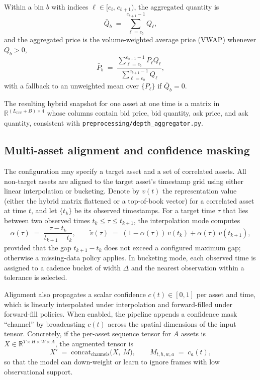 \documentclass[11pt]{article}
\begin{document}
Within a bin $b$ with indices $\ell \in [e_b, e_{b+1})$, the aggregated quantity is
\begin{equation}
  \bar{Q}_{b} \;=\; \sum_{\ell=e_b}^{e_{b+1}-1} Q_{\ell},
\end{equation}
and the aggregated price is the volume-weighted average price (VWAP) whenever $\bar{Q}_b>0$,
\begin{equation}
  \bar{P}_{b} \;=\; \frac{\sum_{\ell=e_b}^{e_{b+1}-1} P_{\ell} Q_{\ell}}{\sum_{\ell=e_b}^{e_{b+1}-1} Q_{\ell}},
\end{equation}
with a fallback to an unweighted mean over $\{P_{\ell}\}$ if $\bar{Q}_b=0$.

The resulting hybrid snapshot for one asset at one time is a matrix in $\mathbb{R}^{(L_{\mathrm{raw}}+B)\times 4}$ whose columns contain bid price, bid quantity, ask price, and ask quantity, consistent with \texttt{preprocessing/depth\_aggregator.py}.

\subsection{Multi-asset alignment and confidence masking}

The configuration may specify a target asset and a set of correlated assets. All non-target assets are aligned to the target asset's timestamp grid using either linear interpolation or bucketing. Denote by $v(t)$ the representation value (either the hybrid matrix flattened or a top-of-book vector) for a correlated asset at time $t$, and let $\{t_k\}$ be its observed timestamps. For a target time $\tau$ that lies between two observed times $t_{k}\le \tau \le t_{k+1}$, the interpolation mode computes
\begin{equation}
  \alpha(\tau) \;=\; \frac{\tau - t_k}{t_{k+1}-t_k}, \qquad \tilde{v}(\tau) \;=\; (1-\alpha(\tau))\,v(t_k) + \alpha(\tau)\,v(t_{k+1}),
\end{equation}
provided that the gap $t_{k+1}-t_k$ does not exceed a configured maximum gap; otherwise a missing-data policy applies. In bucketing mode, each observed time is assigned to a cadence bucket of width $\Delta$ and the nearest observation within a tolerance is selected.

Alignment also propagates a scalar confidence $c(t)\in[0,1]$ per asset and time, which is linearly interpolated under interpolation and forward-filled under forward-fill policies. When enabled, the pipeline appends a confidence mask ``channel'' by broadcasting $c(t)$ across the spatial dimensions of the input tensor. Concretely, if the per-asset sequence tensor for $A$ assets is $X\in\mathbb{R}^{T\times H\times W\times A}$, the augmented tensor is
\begin{equation}
  X' \;=\; \mathrm{concat}_{\mathrm{channels}}\bigl(X,\ M\bigr), \qquad M_{t,h,w,a} \;=\; c_a(t),
\end{equation}
so that the model can down-weight or learn to ignore frames with low observational support.
\end{document}
